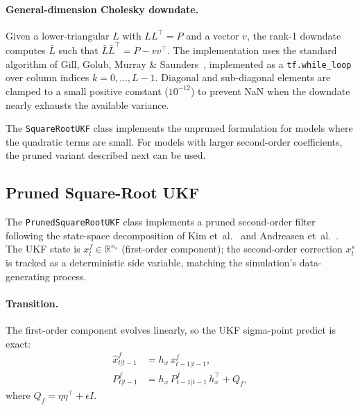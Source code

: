 \documentclass[11pt,a4paper]{article}
\theoremstyle{definition}
\newcommand{\R}{\mathbb{R}}
\newcommand{\code}[1]{\texttt{\color{codecolor}#1}}
\begin{document}
	\paragraph{General-dimension Cholesky downdate.}
	Given a lower-triangular $L$ with $LL^\top = P$ and a vector $v$, the rank-1 downdate computes $\bar{L}$ such that $\bar{L}\bar{L}^\top = P - vv^\top$.
	The implementation uses the standard algorithm of Gill, Golub, Murray \& Saunders~\cite{gill1974methods}, implemented as a \code{tf.while\_loop} over column indices $k = 0, \ldots, L-1$.
	Diagonal and sub-diagonal elements are clamped to a small positive constant ($10^{-12}$) to prevent NaN when the downdate nearly exhausts the available variance.
	
	The \code{SquareRootUKF} class implements the unpruned formulation for models where the quadratic terms are small.
	For models with larger second-order coefficients, the pruned variant described next can be used.
	
	\subsection{Pruned Square-Root UKF}
	\label{sec:pruned_ukf}
	
	The \code{PrunedSquareRootUKF} class implements a pruned second-order filter following the state-space decomposition of Kim et~al.~\cite{kim2008likelihood} and Andreasen et~al.~\cite{andreasen2018pruning}.
	The UKF state is $x^f_t \in \R^{n_s}$ (first-order component); the second-order correction $x^s_t$ is tracked as a deterministic side variable, matching the simulation's data-generating process.
	
	\paragraph{Transition.}
	The first-order component evolves linearly, so the UKF sigma-point predict is exact:
	\begin{align}
		\hat{x}^f_{t|t-1} &= h_x \, x^f_{t-1|t-1}, \label{eq:pukf_xf}\\
		P^f_{t|t-1} &= h_x \, P^f_{t-1|t-1} \, h_x^\top + Q_f, \label{eq:pukf_pf}
	\end{align}
	where $Q_f = \eta\eta^\top + \epsilon I$.
	
\end{document}
